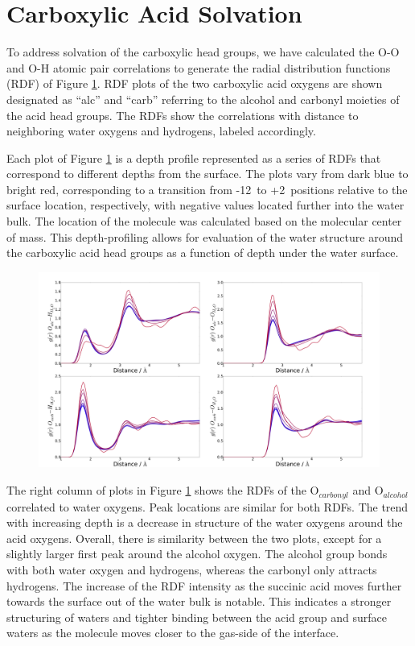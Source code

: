 \section {Carboxylic Acid Solvation}

To address solvation of the carboxylic head groups, we have calculated the O-O and O-H atomic pair correlations to generate the radial distribution functions (RDF) of Figure \ref{fig:rdfs}. RDF plots of the two carboxylic acid oxygens are shown designated as ``alc'' and ``carb'' referring to the alcohol and carbonyl moieties of the acid head groups. The RDFs show the correlations with distance to neighboring water oxygens and hydrogens, labeled accordingly.

Each plot of Figure \ref{fig:rdfs} is a depth profile represented as a series of RDFs that correspond to different depths from the surface. The plots vary from dark blue to bright red, corresponding to a transition from -12\angs~to +2\angs~positions relative to the surface location, respectively, with negative values located further into the water bulk. The location of the molecule was calculated based on the molecular center of mass. This depth-profiling allows for evaluation of the water structure around the carboxylic acid head groups as a function of depth under the water surface.

\begin{figure}[h!]
	\begin{center}
		\includegraphics[scale=1.0]{images/rdf/rdf-collection.png}
		\caption{}
		\label{fig:rdfs}
	\end{center}
\end{figure}

The right column of plots in Figure \ref{fig:rdfs} shows the RDFs of the O$_{carbonyl}$ and O$_{alcohol}$ correlated to water oxygens. Peak locations are similar for both RDFs. The trend with increasing depth is a decrease in structure of the water oxygens around the acid oxygens. Overall, there is similarity between the two plots, except for a slightly larger first peak around the alcohol oxygen. The alcohol group bonds with both water oxygen and hydrogens, whereas the carbonyl only attracts hydrogens. The increase of the RDF intensity as the succinic acid moves further towards the surface out of the water bulk is notable. This indicates a stronger structuring of waters and tighter binding between the acid group and surface waters as the molecule moves closer to the gas-side of the interface.

